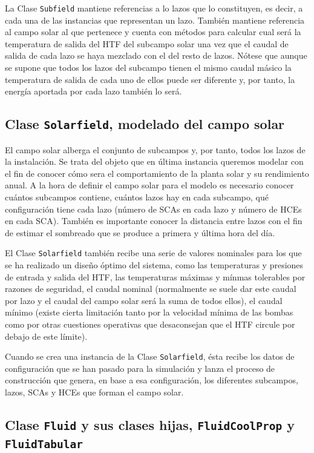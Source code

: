 La Clase \texttt{Subfield} mantiene referencias a lo lazos que lo constituyen, es decir, a cada una de las instancias que representan un lazo. También mantiene referencia al campo solar al que pertenece y cuenta con métodos para calcular cual será la temperatura de salida del HTF del subcampo solar una vez que el caudal de salida de cada lazo se haya mezclado con el del resto de lazos. Nótese que aunque se supone que todos los lazos del subcampo tienen el mismo caudal másico la temperatura de salida de cada uno de ellos puede ser diferente y, por tanto, la energía aportada por cada lazo también lo será. 

\subsection{Clase \texttt{Solarfield}, modelado del campo solar}
\label{solarfield}

El campo solar alberga el conjunto de subcampos y, por tanto, todos los lazos de la instalación. Se trata del objeto que en última instancia queremos modelar con el fin de conocer cómo sera el comportamiento de la planta solar y su rendimiento anual. A la hora de definir el campo solar para el modelo es necesario conocer cuántos subcampos contiene, cuántos lazos hay en cada subcampo, qué configuración tiene cada lazo (número de SCAs en cada lazo y número de HCEs en cada SCA). También es importante conocer la distancia entre lazos con el fin de estimar el sombreado que se produce a primera y última hora del día. 

El Clase \texttt{Solarfield} también recibe una serie de valores nominales para los que se ha realizado un diseño óptimo del sistema, como las temperaturas y presiones de entrada y salida del HTF, las temperaturas máximas y mínmas tolerables por razones de seguridad, el caudal nominal (normalmente se suele dar este caudal por lazo y el caudal del campo solar será la suma de todos ellos), el caudal mínimo (existe cierta limitación tanto por la velocidad mínima de las bombas como por otras
cuestiones operativas que desaconsejan que el HTF circule por debajo de este límite).

Cuando se crea una instancia de la Clase \texttt{Solarfield}, ésta recibe los datos de configuración que se han pasado para la simulación y lanza el proceso de construcción que genera, en base a esa configuración, los diferentes subcampos, lazos, SCAs y HCEs que forman el campo solar.

\subsection{Clase \texttt{Fluid} y sus clases hijas, \texttt{FluidCoolProp} y \texttt{FluidTabular}}
\label{subclases-fluid}

